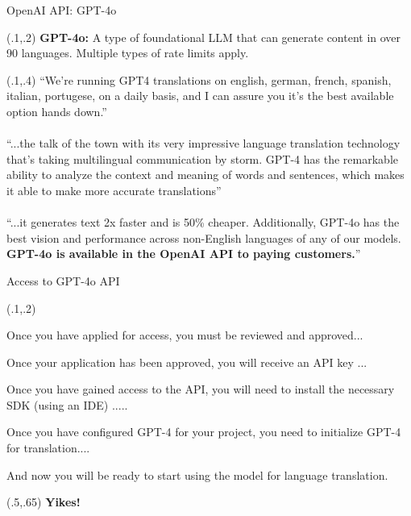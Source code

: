 \documentclass{beamer}
\begin{document}
\begin{frame}{OpenAI API: GPT-4o}

\begin{textblock}{1}(.1,.2)
  \small {\textbf{GPT-4o:} A type of foundational LLM that can generate content in over 90 languages. Multiple types of rate limits apply. }
\end{textblock}


\begin{textblock}{1}(.1,.4)
  \footnotesize {\enquote{We're running GPT4 translations on english, german, french, spanish, italian, portugese, on a daily basis, and I can assure you it's the best available option hands down.}\\~\\
  \enquote{...the talk of the town with its very impressive language translation technology that's taking multilingual communication by storm. GPT-4 has the remarkable ability to analyze the context and meaning of words and sentences, which makes it able to make more accurate translations}\\~\\
  \enquote{...it generates text 2x faster and is 50\% cheaper. Additionally, GPT-4o has the best vision and performance across non-English languages of any of our models. \textbf{GPT-4o is available in the OpenAI API to paying customers.}}
}
\end{textblock}

\end{frame}


\begin{frame}{Access to GPT-4o API}

\begin{textblock}{1}(.1,.2)
  \footnotesize {Once you have applied for access, you must be reviewed and approved...

Once your application has been approved, you will receive an API key ...

Once you have gained access to the API, you will need to install the necessary SDK (using an IDE) ..... 

Once you have configured GPT-4 for your project, you need to initialize GPT-4 for translation....

And now you will be ready to start using the model for language translation.}
\end{textblock}

\begin{textblock}{1}(.5,.65)
  \normalsize{\textbf{Yikes!}}
\end{textblock}

\end{frame}
\end{document}
